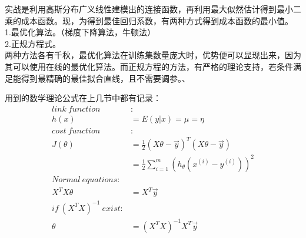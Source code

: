 实战是利用高斯分布广义线性建模出的连接函数，再利用最大似然估计得到最小二乘的成本函数。现，为得到最佳回归系数，有两种方式得到成本函数的最小值。\\
1.最优化算法。（梯度下降算法，牛顿法）\\
2.正规方程式。\\
两种方法各有千秋，最优化算法在训练集数量庞大时，优势便可以显现出来，因为其可以使用在线的最优化算法。而正规方程的方法，有严格的理论支持，若条件满足能得到最精确的最佳拟合直线，且不需要调参。、


用到的数学理论公式在上几节中都有记录：
\begin{equation}\nonumber
\begin{split}
 link~function~&:\\
 h(x) &=E(y|x)=\mu=\eta\\
 cost~function~&:\\
 J(\theta)&=\frac{1}{2}(X\theta-\vec{y})^T (X\theta-\vec{y})\\
         &=\frac{1}{2}\sum_{i=1}^{m}(h_\theta(x^{(i)}-y^{(i)}))^2\\
Normal~equations:&\\
X^TX\theta &=X^T\vec{y}\\
if~(X^TX)^{-1}~exist:&\\
\theta&=(X^TX)^{-1}X^T\vec{y}
\end{split}
\end{equation}

